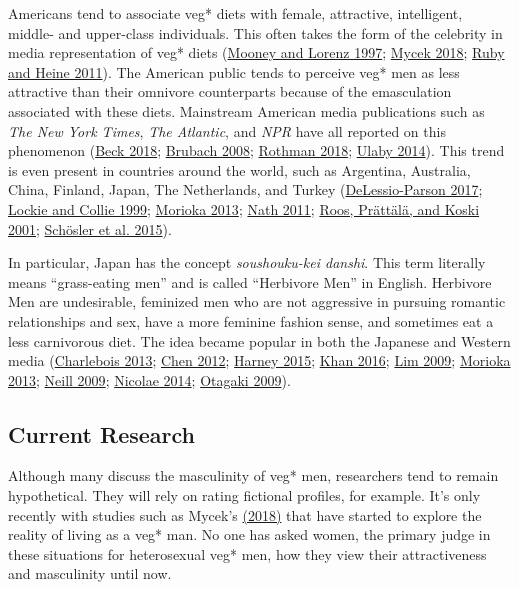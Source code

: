 \documentclass[twoside]{report}
\begin{document}
Americans tend to associate veg* diets with female, attractive,
intelligent, middle- and upper-class individuals. This often takes the
form of the celebrity in media representation of veg* diets (\hyperlink{mooney}{Mooney and
Lorenz 1997}; \hyperlink{mycek}{Mycek 2018}; \hyperlink{ruby}{Ruby and Heine 2011}). The American public
tends to perceive veg* men as less attractive than their omnivore
counterparts because of the emasculation associated with these diets.
Mainstream American media publications such as \emph{The New York
Times}, \emph{The Atlantic}, and \emph{NPR} have all reported on this
phenomenon (\hyperlink{beck}{Beck 2018}; \hyperlink{brubach}{Brubach 2008}; \hyperlink{rothman}{Rothman 2018}; \hyperlink{ulaby}{Ulaby 2014}). This trend is even present in countries around the world, such as Argentina, Australia,
China, Finland, Japan, The Netherlands, and Turkey (\hyperlink{delassio-parson}{DeLessio-Parson
2017}; \hyperlink{lockie}{Lockie and Collie 1999}; \hyperlink{morioka}{Morioka 2013}; \hyperlink{nath}{Nath 2011}; \hyperlink{roos}{Roos, Prättälä,
and Koski 2001}; \hyperlink{schosler}{Schösler et al. 2015}). 

In particular, Japan has the concept \emph{soushouku-kei danshi}. This term literally means ``grass-eating men'' and is called ``Herbivore Men'' in English. Herbivore Men are undesirable, feminized men who are not aggressive in pursuing romantic relationships and sex, have a more feminine fashion
sense, and sometimes eat a less carnivorous diet. The idea became
popular in both the Japanese and Western media (\hyperlink{charlebois}{Charlebois 2013}; \hyperlink{chen}{Chen 2012}; \hyperlink{harney}{Harney 2015}; \hyperlink{khan}{Khan 2016}; \hyperlink{lim}{Lim 2009}; \hyperlink{morioka}{Morioka 2013}; \hyperlink{neill}{Neill 2009}; \hyperlink{nicolae}{Nicolae 2014}; \hyperlink{otagaki}{Otagaki 2009}).

\subsection{Current Research}

Although many discuss the masculinity of veg* men, researchers tend to
remain hypothetical. They will rely on rating fictional profiles, for
example. It's only recently with studies such as Mycek's \hyperlink{mycek}{(2018)} that have started to explore the reality of living as a veg* man. No one has asked women, the primary judge in these situations for heterosexual veg* men, how they view their attractiveness and masculinity until now.
\end{document}

